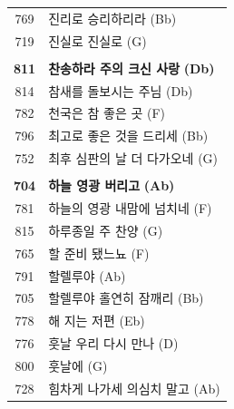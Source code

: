 \begin{supertabular}{c l}
769 & 진리로 승리하리라 (Bb) \\
719 & 진실로 진실로 (G) \\
 & \\
\textbf{811} & \textbf{찬송하라 주의 크신 사랑} \textbf{(Db)} \\
814 & 참새를 돌보시는 주님 (Db) \\
782 & 천국은 참 좋은 곳 (F) \\
796 & 최고로 좋은 것을 드리세 (Bb) \\
752 & 최후 심판의 날 더 다가오네 (G) \\
 & \\
\textbf{704} & \textbf{하늘 영광 버리고} \textbf{(Ab)} \\
781 & 하늘의 영광 내맘에 넘치네 (F) \\
815 & 하루종일 주 찬양 (G) \\
765 & 할 준비 됐느뇨 (F) \\
791 & 할렐루야 (Ab) \\
705 & 할렐루야 홀연히 잠깨리 (Bb) \\
778 & 해 지는 저편 (Eb) \\
776 & 훗날 우리 다시 만나 (D) \\
800 & 훗날에 (G) \\
728 & 힘차게 나가세 의심치 말고 (Ab) \\
\end{supertabular}
\clearpage


